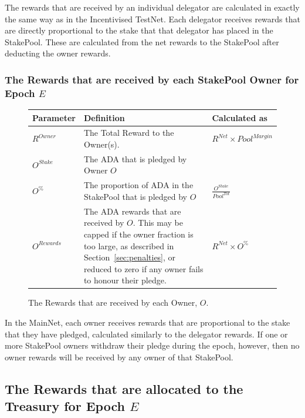 \documentclass[11pt,a4paper,dvipsnames,twosided,final]{article}
\newcommand{\khcomment}[1]{\todo[color=blue!20]{KH: #1}}
\newcommand{\ada}{ADA{}}
\begin{document}
\noindent
The rewards that are received by an individual delegator are calculated in exactly the same way as in
the Incentivised TestNet.  Each delegator receives rewards that are directly proportional to the
stake that that delegator has placed in the StakePool.  These are calculated from the net rewards to the
StakePool after deducting the owner rewards.

\clearpage
\subsubsection*{The Rewards that are received by each StakePool Owner for Epoch $E$}


\begin{figure}[h!]
\begin{center}
\begin{tabular}{||l|p{9cm}|l||}
  \hline \hline
\textbf{Parameter}  & \textbf{Definition} & \textbf{Calculated as} \\\hline
$R^\textit{Owner}$ & The Total Reward to the Owner(s).  & $R^{\textit{Net}} \times {\textit{Pool}}^{\textit{Margin}}$ \\\hline
$O^\textit{Stake}$ & The \ada{} that is pledged by Owner $O$ & \\\hline
$O^\%$ & The proportion of \ada{} in the StakePool that is pledged by $O$ & $\frac{O^{Stake}}{Pool^{Tot}}$ \\\hline
$O^{Rewards}$ & The \ada{} rewards that are received by $O$. This may be capped if the owner fraction is too large,
as described in Section~\ref{sec:penalties}, or reduced to zero if any owner fails to honour their pledge. & $R^{\textit{Net}} \times O^\%$ \\\hline
\hline
\end{tabular}
\end{center}
\caption{The Rewards that are received by each Owner, $O$.}
\end{figure}

\noindent
In the MainNet, each owner receives rewards that are proportional to the stake that they have pledged,
calculated similarly to the delegator rewards.  If one or more StakePool owners withdraw their pledge during the epoch,
however, then no owner rewards will be received by any owner of that StakePool.


\clearpage
\subsection{The Rewards that are allocated to the Treasury for Epoch $E$}
\end{document}
